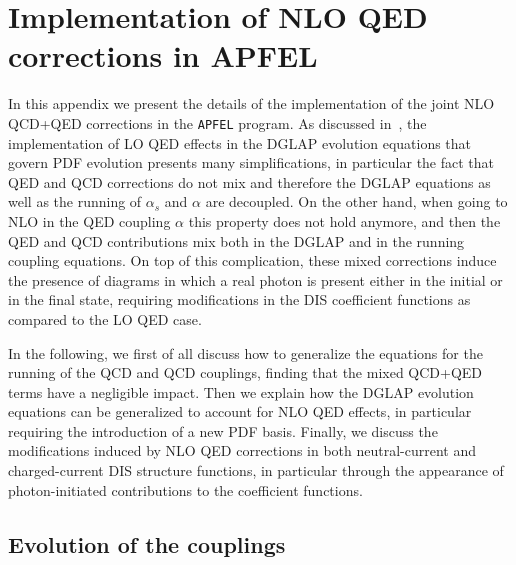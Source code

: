 \appendix

\section{Implementation of
NLO QED corrections in APFEL}
\label{sec:appendixAPFEL}

In this appendix we present the details of the implementation of the
joint NLO QCD+QED corrections in the {\tt APFEL}
program.
%
As discussed in~\cite{Bertone:2013vaa}, the implementation of LO
QED effects in the DGLAP evolution
equations that govern PDF evolution
presents many simplifications, in particular the fact that
QED and QCD corrections do not mix and therefore the DGLAP
equations as well as the running of $\alpha_s$ and $\alpha$ are
decoupled.
%
On the other hand, when going to NLO in the
QED coupling $\alpha$ this property does not hold
anymore, and then the QED and QCD contributions mix both in the DGLAP and in
the running coupling  equations.
%
On top of this complication, these mixed corrections induce the
presence of diagrams in which a real photon is present either in the
initial or in the final state, requiring modifications in the
DIS coefficient functions as compared to the LO QED case.

In the following, we first of all discuss how to generalize the 
 equations  for the running
of the QCD and QCD couplings, finding that the mixed QCD+QED
terms have a negligible impact.
%
Then we explain how the DGLAP evolution equations can be generalized
to account for NLO QED effects, in particular requiring the
introduction of a new PDF basis.
%
Finally, we discuss the modifications induced by NLO QED
corrections in both neutral-current
and charged-current DIS structure functions, in particular
through the appearance of photon-initiated contributions
to the coefficient functions.

\subsection{Evolution of the couplings}

